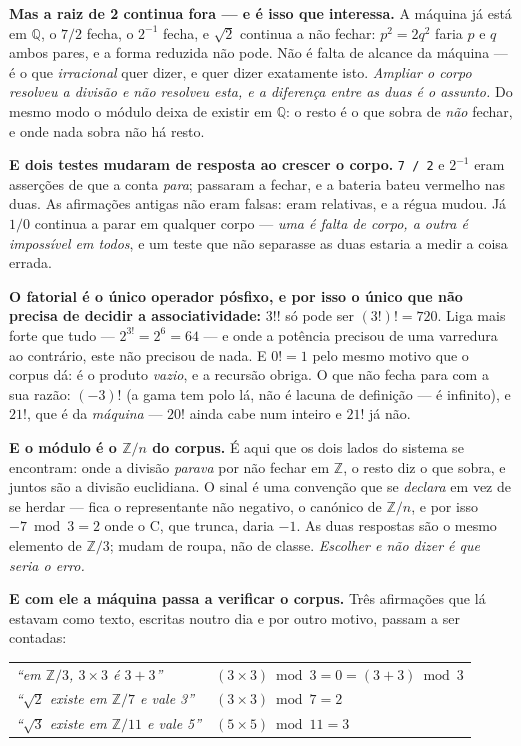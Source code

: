\documentclass[11pt]{article}
\newcommand{\code}[1]{\texttt{\small #1}}
\theoremstyle{plain}
\theoremstyle{remark}
\begin{document}
\begin{itemize}
\textbf{Mas a raiz de 2 continua fora --- e é isso que interessa.} A máquina já está em
$\mathbb{Q}$, o $7/2$ fecha, o $2^{-1}$ fecha, e $\sqrt{2}$ continua a não fechar: $p^2 = 2q^2$
faria $p$ e $q$ ambos pares, e a forma reduzida não pode. Não é falta de alcance da máquina --- é
o que \emph{irracional} quer dizer, e quer dizer exatamente isto. \emph{Ampliar o corpo resolveu a
divisão e não resolveu esta, e a diferença entre as duas é o assunto.} Do mesmo modo o módulo
deixa de existir em $\mathbb{Q}$: o resto é o que sobra de \emph{não} fechar, e onde nada sobra não
há resto.

\textbf{E dois testes mudaram de resposta ao crescer o corpo.} \code{7 / 2} e $2^{-1}$ eram
asserções de que a conta \emph{para}; passaram a fechar, e a bateria bateu vermelho nas duas. As
afirmações antigas não eram falsas: eram relativas, e a régua mudou. Já $1/0$ continua a parar em
qualquer corpo --- \emph{uma é falta de corpo, a outra é impossível em todos}, e um teste que não
separasse as duas estaria a medir a coisa errada.

\textbf{O fatorial é o único operador pósfixo, e por isso o único que não precisa de decidir a
associatividade:} $3!!$ só pode ser $(3!)! = 720$. Liga mais forte que tudo --- $2^{3!} = 2^6 =
64$ --- e onde a potência precisou de uma varredura ao contrário, este não precisou de nada. E
$0! = 1$ pelo mesmo motivo que o corpus dá: é o produto \emph{vazio}, e a recursão obriga. O que
não fecha para com a sua razão: $(-3)!$ (a gama tem polo lá, não é lacuna de definição --- é
infinito), e $21!$, que é da \emph{máquina} --- $20!$ ainda cabe num inteiro e $21!$ já não.

\textbf{E o módulo é o $\mathbb{Z}/n$ do corpus.} É aqui que os dois lados do sistema se
encontram: onde a divisão \emph{parava} por não fechar em $\mathbb{Z}$, o resto diz o que sobra,
e juntos são a divisão euclidiana. O sinal é uma convenção que se \emph{declara} em vez de se
herdar --- fica o representante não negativo, o canónico de $\mathbb{Z}/n$, e por isso
$-7 \bmod 3 = 2$ onde o C, que trunca, daria $-1$. As duas respostas são o mesmo elemento de
$\mathbb{Z}/3$; mudam de roupa, não de classe. \emph{Escolher e não dizer é que seria o erro.}

\textbf{E com ele a máquina passa a verificar o corpus.} Três afirmações que lá estavam como
texto, escritas noutro dia e por outro motivo, passam a ser contadas:

\begin{center}
\begin{tabular}{ll}
\emph{``em $\mathbb{Z}/3$, $3\times 3$ é $3+3$''} & $(3\times 3)\bmod 3 = 0 = (3+3)\bmod 3$ \\
\emph{``$\sqrt{2}$ existe em $\mathbb{Z}/7$ e vale 3''} & $(3\times 3)\bmod 7 = 2$ \\
\emph{``$\sqrt{3}$ existe em $\mathbb{Z}/11$ e vale 5''} & $(5\times 5)\bmod 11 = 3$ \\
\end{tabular}
\end{center}


\end{itemize}
\end{document}
